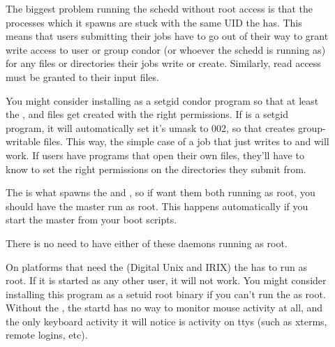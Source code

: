 \begin{description}
\item[] The biggest problem running the schedd
    without root access is that the  processes which it
    spawns are stuck with the same UID the  has.  This
    means that users submitting their jobs have to go out of their way
    to grant write access to user or group condor (or whoever the
    schedd is running as) for any files or directories their jobs
    write or create.  Similarly, read access must be granted to their
    input files.

    You might consider installing  as a setgid condor
    program so that at least the ,  and
     files get created with the right permissions.  If
     is a setgid program, it will automatically set
    it's umask to 002, so that creates group-writable files.  This
    way, the simple case of a job that just writes to 
    and  will work.  If users have programs that open
    their own files, they'll have to know to set the right permissions
    on the directories they submit from.

\item[] The  is what spawns the
     and , so if want them both running
    as root, you should have the master run as root.  This happens
    automatically if you start the master from your boot scripts.

\item[]
\item[] There is no need to have either of these
daemons running as root.

\item[] On platforms that need the  (Digital
    Unix and IRIX) the  has to run as root.  If it is
    started as any other user, it will not work.  You might consider
    installing this program as a setuid root binary if you can't run
    the  as root.  Without the , the
    startd has no way to monitor mouse activity at all, and the only
    keyboard activity it will notice is activity on ttys (such as
    xterms, remote logins, etc).

\end{description}